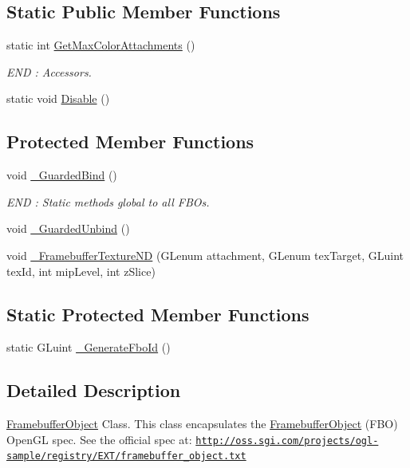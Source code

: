 \subsection*{Static Public Member Functions}
\begin{DoxyCompactItemize}
\item 
static int \hyperlink{class_framebuffer_object_ad4c7199850737c4a62b16f102641006d}{GetMaxColorAttachments} ()
\begin{DoxyCompactList}\small\item\em END : Accessors. \end{DoxyCompactList}\item 
static void \hyperlink{class_framebuffer_object_ae327450680f21e18893c3657b8635bf3}{Disable} ()
\end{DoxyCompactItemize}
\subsection*{Protected Member Functions}
\begin{DoxyCompactItemize}
\item 
void \hyperlink{class_framebuffer_object_a98dedda4a464b389da7bf922d9a1f177}{\_\-GuardedBind} ()
\begin{DoxyCompactList}\small\item\em END : Static methods global to all FBOs. \end{DoxyCompactList}\item 
void \hyperlink{class_framebuffer_object_a3935a7e0d87eab285cb667103fbb7b4d}{\_\-GuardedUnbind} ()
\item 
void \hyperlink{class_framebuffer_object_a22cbada4c9d986edf1044bbb72c18959}{\_\-FramebufferTextureND} (GLenum attachment, GLenum texTarget, GLuint texId, int mipLevel, int zSlice)
\end{DoxyCompactItemize}
\subsection*{Static Protected Member Functions}
\begin{DoxyCompactItemize}
\item 
static GLuint \hyperlink{class_framebuffer_object_a06e52f50f7a54fd8047d49cb4d93d6a7}{\_\-GenerateFboId} ()
\end{DoxyCompactItemize}


\subsection{Detailed Description}
\hyperlink{class_framebuffer_object}{FramebufferObject} Class. This class encapsulates the \hyperlink{class_framebuffer_object}{FramebufferObject} (FBO) OpenGL spec. See the official spec at: \href{http://oss.sgi.com/projects/ogl-sample/registry/EXT/framebuffer_object.txt}{\tt http://oss.sgi.com/projects/ogl-\/sample/registry/EXT/framebuffer\_\-object.txt}

